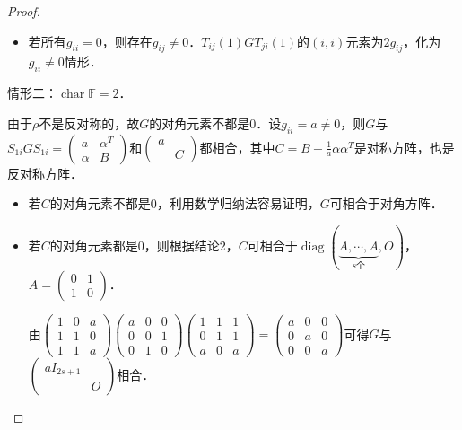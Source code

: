 \documentclass[a4paper,fontset=windows]{ctexbook}
\theoremstyle{definition}
\DeclareMathOperator{\Char}{char}
\DeclareMathOperator{\diag}{diag}
\begin{document}
\begin{proof}
\begin{enumerate}
\begin{itemize}
\item 若所有$g_{ii}=0$，则存在$g_{ij}\ne 0$．$T_{ij}(1)GT_{ji}(1)$的$(i,i)$元素为$2g_{ij}$，化为$g_{ii}\ne 0$情形．
\end{itemize}

情形二：$\Char\mathbb{F}=2$．

由于$\rho$不是反对称的，故$G$的对角元素不都是0．设$g_{ii}=a\ne 0$，则$G$与$S_{1i}GS_{1i}=\begin{pmatrix}a&\alpha^T \\ \alpha&B\end{pmatrix}$和$\begin{pmatrix}a& \\ &C\end{pmatrix}$都相合，其中$C=B-\frac{1}{a}\alpha\alpha^T$是对称方阵，也是反对称方阵．
\begin{itemize}
\item 若$C$的对角元素不都是0，利用数学归纳法容易证明，$G$可相合于对角方阵．

\item 若$C$的对角元素都是0，则根据结论2，$C$可相合于$\diag(\underbrace{A,\cdots,A}_{s\text{个}},O)$，$A=\begin{pmatrix}0&1 \\ 1&0\end{pmatrix}$．

由$\begin{pmatrix}1&0&a \\ 1&1&0 \\ 1&1&a\end{pmatrix}\begin{pmatrix}a&0&0 \\ 0&0&1 \\ 0&1&0\end{pmatrix}\begin{pmatrix}1&1&1 \\ 0&1&1 \\ a&0&a\end{pmatrix}=\begin{pmatrix}a&0&0 \\ 0&a&0 \\ 0&0&a\end{pmatrix}$可得$G$与$\begin{pmatrix}aI_{2s+1}& \\ &O\end{pmatrix}$相合．
\end{itemize}
\end{enumerate}
\end{proof}
\end{document}
